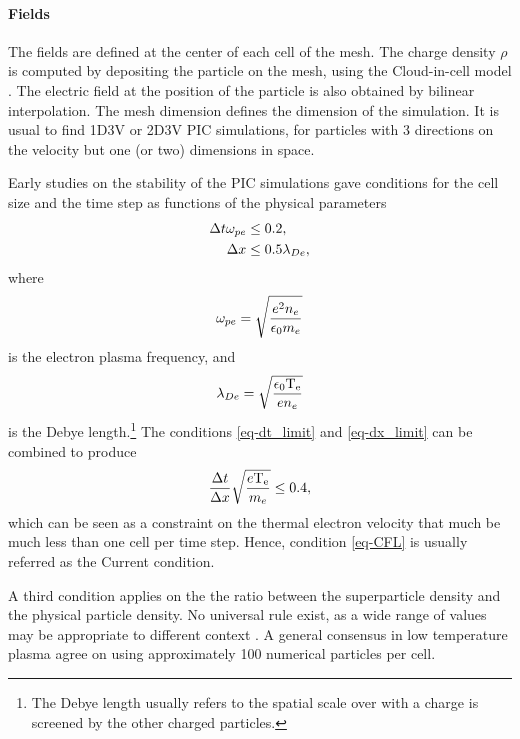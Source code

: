     \paragraph{Fields\\}
    The fields are defined at the center of each cell of the mesh.
    The charge density $\rho$ is computed by depositing the particle on the mesh, using the Cloud-in-cell model \cite{birdsall1991}.
    The electric field at the position of the particle is also obtained by bilinear interpolation.
    The mesh dimension defines the dimension of the simulation.
    It is usual to find \acs{1D}\acs{3V} or \acs{2D}\acs{3V} \ac{PIC} simulations, for particles with 3 directions on the velocity but one (or two) dimensions in space.
    
    Early studies on the stability of the \ac{PIC} simulations gave conditions for the cell size and the time step as functions of the physical parameters \citep{birdsall1991,turner2013}
    \begin{align}
      \Delta t  \omega_{pe} &\leq 0.2,  \label{eq-dt_limit} \\
      \Delta x &\leq 0.5 \lambda_{De}, \label{eq-dx_limit}
    \end{align}
    where 
    \begin{equation} \label{eq-def_ope}
      \omega_{pe} =  \sqrt{\frac{e^2 n_e}{ \epsilon_0 m_e}}
    \end{equation}
    is the electron plasma frequency, and 
    \begin{equation} \label{eq-def_lde}
        \lambda_{De} = \sqrt{\frac{ \epsilon_0 \mathrm{T_e}}{e n_e}} 
    \end{equation}
    is the Debye length.\footnote{The Debye length usually refers to the spatial scale over with a charge is screened by the other charged particles. }
    The conditions \ref{eq-dt_limit} and \ref{eq-dx_limit} can be combined to produce 
    \begin{equation} \label{eq-CFL}
      \frac{\Delta t}{\Delta x}\sqrt{\frac{e \mathrm{T_e}}{m_e}} \leq 0.4,
    \end{equation}
    which can be seen as a constraint on the thermal electron velocity that much be much less than one cell per time step.
    Hence, condition \ref{eq-CFL} is usually referred as the Current condition.
    
    A third condition applies on the  the ratio between the superparticle density and the physical particle density. 
    No universal rule exist, as a wide range of values may be appropriate to different context \citep{turner2006,turner2013}.
    A general consensus in low temperature plasma agree on using approximately 100 numerical particles per cell.
    
